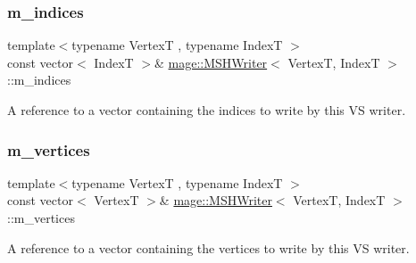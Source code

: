 \subsubsection{\texorpdfstring{m\+\_\+indices}{m\_indices}}
{\footnotesize\ttfamily template$<$typename VertexT , typename IndexT $>$ \\
const vector$<$ IndexT $>$\& \hyperlink{classmage_1_1_m_s_h_writer}{mage\+::\+M\+S\+H\+Writer}$<$ VertexT, IndexT $>$\+::m\+\_\+indices\hspace{0.3cm}{\ttfamily [private]}}

A reference to a vector containing the indices to write by this VS writer. \hypertarget{classmage_1_1_m_s_h_writer_ac0fc94011fd8200a83082201eee5ded5}{}\label{classmage_1_1_m_s_h_writer_ac0fc94011fd8200a83082201eee5ded5} 
\subsubsection{\texorpdfstring{m\+\_\+vertices}{m\_vertices}}
{\footnotesize\ttfamily template$<$typename VertexT , typename IndexT $>$ \\
const vector$<$ VertexT $>$\& \hyperlink{classmage_1_1_m_s_h_writer}{mage\+::\+M\+S\+H\+Writer}$<$ VertexT, IndexT $>$\+::m\+\_\+vertices\hspace{0.3cm}{\ttfamily [private]}}

A reference to a vector containing the vertices to write by this VS writer. 